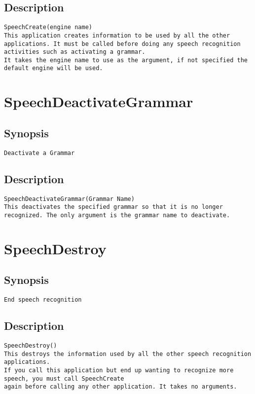 \subsection{Description}
\begin{verbatim}
SpeechCreate(engine name)
This application creates information to be used by all the other applications. It must be called before doing any speech recognition activities such as activating a grammar.
It takes the engine name to use as the argument, if not specified the default engine will be used.

\end{verbatim}


\section{SpeechDeactivateGrammar}
\subsection{Synopsis}
\begin{verbatim}
Deactivate a Grammar
\end{verbatim}
\subsection{Description}
\begin{verbatim}
SpeechDeactivateGrammar(Grammar Name)
This deactivates the specified grammar so that it is no longer recognized. The only argument is the grammar name to deactivate.

\end{verbatim}


\section{SpeechDestroy}
\subsection{Synopsis}
\begin{verbatim}
End speech recognition
\end{verbatim}
\subsection{Description}
\begin{verbatim}
SpeechDestroy()
This destroys the information used by all the other speech recognition applications.
If you call this application but end up wanting to recognize more speech, you must call SpeechCreate
again before calling any other application. It takes no arguments.

\end{verbatim}


